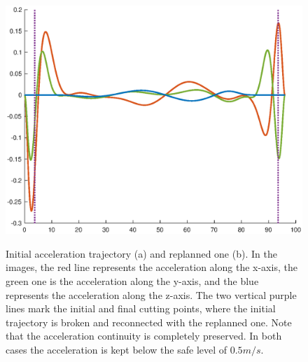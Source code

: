 \begin{figure}[!t]
\begin{center}
\begin{minipage}{.45\linewidth}
{				\includegraphics[width = 1.05\textwidth]{Figs/Chapter6/replan_post_acc.eps}}
		\end{minipage}
	\end{center}
	\caption{Initial acceleration trajectory (a) and replanned one (b).
    In the images, the red line represents the acceleration along the x-axis, the green one is the acceleration along the y-axis,
    and the blue represents the acceleration along the z-axis. The two vertical purple lines mark the initial and final cutting
    points, where the initial trajectory is broken and reconnected with the replanned one. Note that the acceleration continuity
    is completely preserved. In both cases the acceleration is kept below the safe level of $0.5m/s$.}%
    \label{FIG:REPLANNING-RESULTS-ACCELERATION}
\end{figure}
